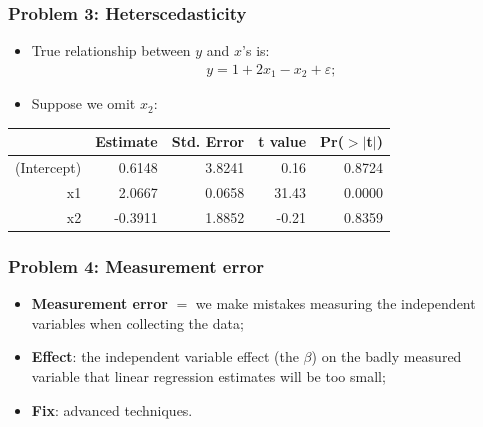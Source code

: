 \documentclass[aspectratio=169]{beamer}
\theoremstyle{principle}
\begin{document}
\begin{frame}
\frametitle{Problem 3: Heterscedasticity}

\begin{itemize}
\item True relationship between $y$ and $x$'s is:
\begin{align*}
y = 1 + 2x_1 - x_2 + \varepsilon;
\end{align*}
\item[]\color{white} Suppose we omit $x_2$:
\end{itemize}

\begin{table}[ht]
\centering
\begin{tabular}{rrrrr}
  \hline
  \hline
 & Estimate & Std. Error & t value & Pr($>$$|$t$|$) \\ 
  \hline
    \hline
(Intercept) & 0.6148 & 3.8241 & 0.16 & 0.8724 \\ 
  x1 & 2.0667 & 0.0658 & 31.43 & 0.0000 \\ 
  x2 & -0.3911 & 1.8852 & -0.21 & 0.8359 \\ 
   \hline
      \hline
\end{tabular}
\end{table}

\end{frame}

\begin{frame}
\frametitle{Problem 4: Measurement error}

\begin{itemize}
\item \textbf{Measurement error} $=$ we make mistakes measuring the independent variables when collecting the data;
\bigskip
\bigskip

\item \textbf{Effect}: the independent variable effect (the $\beta$) on the badly measured variable that linear regression estimates will be too small;
\bigskip
\bigskip

\item \textbf{Fix}: advanced techniques.

\end{itemize}

\end{frame}
\end{document}
